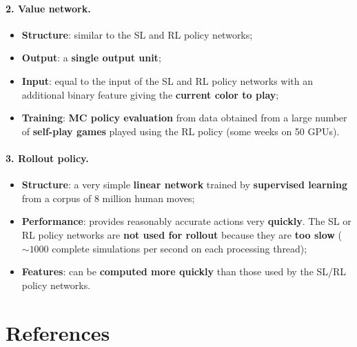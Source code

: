 \documentclass[11pt,a4paper]{article}
\theoremstyle{definition}
\theoremstyle{plain}
\theoremstyle{remark}
\begin{document}
\paragraph{2. Value network.}
\begin{itemize}
    \item \textbf{Structure}: similar to the SL and RL policy networks;
    \item \textbf{Output}: a \textbf{single output unit};
    \item \textbf{Input}: equal to the input of the SL and RL policy networks with an additional binary feature giving the \textbf{current color to play};
    \item \textbf{Training}: \textbf{MC policy evaluation} from data obtained from a large number of \textbf{self-play games} played using the RL policy (some weeks on 50 GPUs).
\end{itemize}

\paragraph{3. Rollout policy.}
\begin{itemize}
    \item \textbf{Structure}: a very simple \textbf{linear network} trained by \textbf{supervised learning} from a corpus of 8 million human moves;
    \item \textbf{Performance}: provides reasonably accurate actions very \textbf{quickly}. The SL or RL policy networks are \textbf{not used for rollout} because they are \textbf{too slow} ($\sim 1000$ complete simulations per second on each processing thread);
    \item \textbf{Features}: can be \textbf{computed more quickly} than those used by the SL/RL policy networks.
\end{itemize}

\section*{References}
\end{document}
